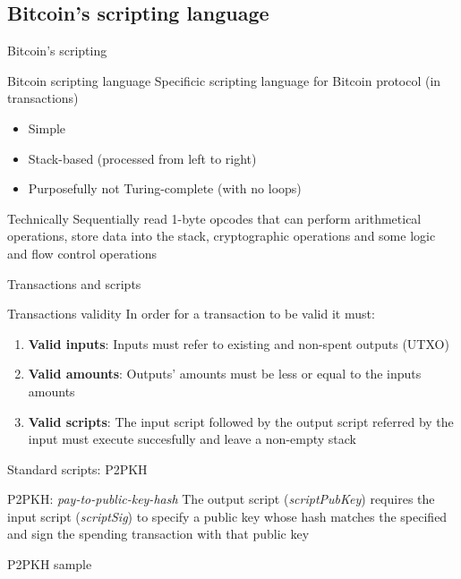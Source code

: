 \documentclass{beamer}
\begin{document}
\subsection{Bitcoin's scripting language}
\begin{frame}{Bitcoin's scripting}
 \begin{block}{Bitcoin scripting language}
  Specificic scripting language for Bitcoin protocol (in transactions)
  \begin{itemize}[<+->]
   \item Simple
   \item Stack-based (processed from left to right)
   \item Purposefully not Turing-complete (with no loops)
  \end{itemize}
 \end{block}
 \pause
 \begin{block}{Technically}
  Sequentially read 1-byte opcodes that can perform arithmetical operations, store data into the stack, cryptographic operations and some logic and flow control operations
 \end{block}
\end{frame}
\begin{frame}{Transactions and scripts}
 \begin{block}{Transactions validity}
  In order for a transaction to be valid it must:
  \begin{enumerate}[<+->]
   \item \textbf{Valid inputs}: Inputs must refer to existing and non-spent outputs (UTXO)
   \item \textbf{Valid amounts}: Outputs' amounts must be less or equal to the inputs amounts
   \item \textbf{Valid scripts}: The input script followed by the output script referred by the input must execute succesfully and leave a non-empty stack
  \end{enumerate}
 \end{block}
\end{frame}
\begin{frame}{Standard scripts: P2PKH}
 \begin{block}{P2PKH: \textit{pay-to-public-key-hash}}
  The output script (\textit{scriptPubKey}) requires the input script (\textit{scriptSig}) to specify a public key whose hash matches the specified and sign the spending transaction with that public key
 \end{block}
 \pause
 \begin{exampleblock}{P2PKH sample}
  \begin{itemize}
  \end{itemize}
 \end{exampleblock}
\end{frame}
\end{document}
